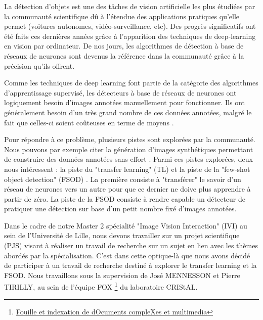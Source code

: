 \label{chap:introduction}
\NoChapterHead
La détection d'objets est une des tâches de vision artificielle les plus étudiées par la communauté scientifique dû à l'étendue des applications pratiques qu'elle permet (voitures autonomes, vidéo-surveillance, etc). Des progrès significatifs ont été faits ces dernières années grâce à l'apparition des techniques de deep-learning en vision par ordinateur. De nos jours, les algorithmes de détection à base de réseaux de neurones \cite{Object-detection-survey} sont devenus la référence dans la communauté grâce à la précision qu'ils offrent.

Comme les techniques de deep learning font partie de la catégorie des algorithmes d'apprentissage supervisé, les détecteurs à base de réseaux de neurones ont logiquement besoin d'images annotées manuellement pour fonctionner. Ils ont généralement besoin d'un très grand nombre de ces données annotées, malgré le fait que celles-ci soient coûteuses en terme de moyens \cite{Su2012CrowdsourcingAF}.

Pour répondre à ce problème, plusieurs pistes sont explorées par la communauté. Nous pouvons par exemple citer la génération d'images synthétiques permettant de construire des données annotées sans effort \cite{DBLP:journals/corr/RajpuraHB17, Baimukashev2019DeepLB}. Parmi ces pistes explorées, deux nous intéressent : la piste du "transfer learning" (TL) \cite{deep-tl} et la piste de la "few-shot object detection" (FSOD) \cite{FSL-survey}. La première consiste à "transférer" le savoir d'un réseau de neurones vers un autre pour que ce dernier ne doive plus apprendre à partir de zéro. La piste de la FSOD consiste à rendre capable un détecteur de pratiquer une détection sur base d'un petit nombre fixé d'images annotées.

Dans le cadre de notre Master 2 spécialité "Image Vision Interaction" (IVI) au sein de l'Université de Lille, nous devons travailler sur un projet scientifique (PJS) visant à réaliser un travail de recherche sur un sujet en lien avec les thèmes abordés par la spécialisation. C'est dans cette optique-là que nous avons décidé de participer à un travail de recherche destiné à explorer le transfer learning et la FSOD. Nous travaillons sous la supervision de José MENNESSON et Pierre TIRILLY, au sein de l'équipe FOX \footnote{\href{http://www.cristal.univ-lille.fr/FOX/}{Fouille et indexation de dOcuments compleXes et multimedia}} du laboratoire CRIStAL.

